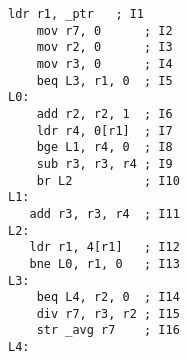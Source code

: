 \begin{lstlisting}[style=AsmStyle]
    ldr r1, _ptr   ; I1
    mov r7, 0      ; I2
    mov r2, 0      ; I3
    mov r3, 0      ; I4
    beq L3, r1, 0  ; I5
L0:
    add r2, r2, 1  ; I6
    ldr r4, 0[r1]  ; I7
    bge L1, r4, 0  ; I8
    sub r3, r3, r4 ; I9
    br L2          ; I10
L1:
   add r3, r3, r4  ; I11
L2:
   ldr r1, 4[r1]   ; I12
   bne L0, r1, 0   ; I13
L3:
    beq L4, r2, 0  ; I14
    div r7, r3, r2 ; I15
    str _avg r7    ; I16
L4: 
\end{lstlisting}

